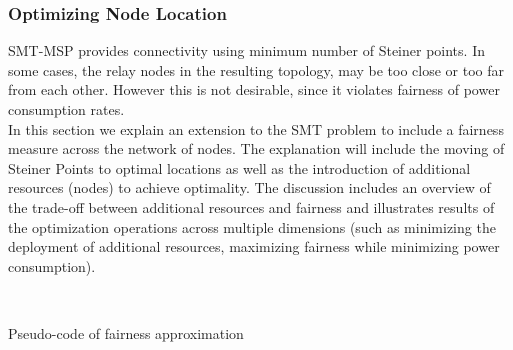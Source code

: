 \subsubsection{Optimizing Node Location}
SMT-MSP provides connectivity using minimum number of Steiner points. In some cases, the relay nodes in the resulting topology, may be too close or too far from each other. However this is not desirable, since it violates fairness of power consumption rates.  \\

In this section we explain an extension to the SMT problem to include a fairness measure across the network of nodes.
The explanation will include the moving of Steiner Points to optimal locations as well as the introduction of additional resources (nodes) to achieve optimality. The discussion includes an overview of the trade-off between additional resources and  fairness and illustrates results of the optimization operations across multiple dimensions (such as minimizing the deployment of additional resources, maximizing fairness while minimizing power consumption).\\ 


\begin{algorithm}[ht]

\dontprintsemicolon
{}
\\
\caption{Pseudo-code of fairness approximation}
\label{MakeFair}
\end{algorithm}


